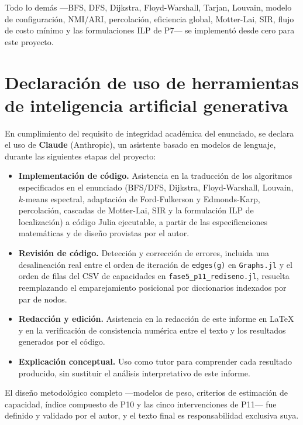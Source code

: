 \documentclass[10pt,a4paper]{extarticle}
\newcommand{\code}[1]{\texttt{\small #1}}
\begin{document}
Todo lo demás ---BFS, DFS, Dijkstra, Floyd-Warshall, Tarjan, Louvain, modelo de
configuración, NMI/ARI, percolación, eficiencia global, Motter-Lai, SIR, flujo de costo
mínimo y las formulaciones ILP de P7--- se implementó desde cero para este proyecto.

\section{Declaración de uso de herramientas de inteligencia artificial generativa}

En cumplimiento del requisito de integridad académica del enunciado, se declara el uso de
\textbf{Claude} (Anthropic), un asistente basado en modelos de lenguaje, durante las
siguientes etapas del proyecto:

\begin{itemize}[leftmargin=*,itemsep=1.5mm]
\item \textbf{Implementación de código.} Asistencia en la traducción de los algoritmos
especificados en el enunciado (BFS/DFS, Dijkstra, Floyd-Warshall, Louvain, $k$-means
espectral, adaptación de Ford-Fulkerson y Edmonds-Karp, percolación, cascadas de Motter-Lai,
SIR y la formulación ILP de localización) a código Julia ejecutable, a partir de las
especificaciones matemáticas y de diseño provistas por el autor.

\item \textbf{Revisión de código.} Detección y corrección de errores, incluida una
desalineación real entre el orden de iteración de \code{edges(g)} en \code{Graphs.jl} y el
orden de filas del CSV de capacidades en \code{fase5\_p11\_rediseno.jl}, resuelta
reemplazando el emparejamiento posicional por diccionarios indexados por par de nodos.

\item \textbf{Redacción y edición.} Asistencia en la redacción de este informe en \LaTeX{} y
en la verificación de consistencia numérica entre el texto y los resultados generados por el
código.

\item \textbf{Explicación conceptual.} Uso como tutor para comprender cada resultado
producido, sin sustituir el análisis interpretativo de este informe.
\end{itemize}

El diseño metodológico completo ---modelos de peso, criterios de estimación de capacidad,
índice compuesto de P10 y las cinco intervenciones de P11--- fue definido y validado por el
autor, y el texto final es responsabilidad exclusiva suya.
\end{document}
